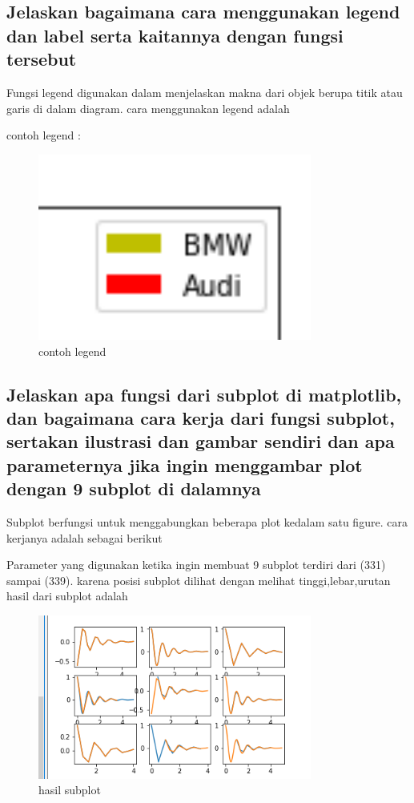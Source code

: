 \subsection{Jelaskan bagaimana cara menggunakan legend dan label serta kaitannya dengan fungsi tersebut}
Fungsi legend digunakan dalam menjelaskan makna dari objek berupa titik atau garis di dalam diagram.
cara menggunakan legend adalah 

contoh legend :
\begin{figure}[H]
    \includegraphics[width=9cm]{figures/6/Teori/1174004/4legend.png}
    \caption{contoh legend}
    \centering
\end{figure}

\subsection{Jelaskan apa fungsi dari subplot di matplotlib, dan bagaimana cara kerja dari fungsi subplot, sertakan ilustrasi dan gambar sendiri dan apa parameternya jika ingin menggambar plot dengan 9 subplot di dalamnya}
Subplot berfungsi untuk menggabungkan beberapa plot kedalam satu figure.
cara kerjanya adalah sebagai berikut

Parameter yang digunakan ketika ingin membuat 9 subplot terdiri dari (331) sampai (339). karena posisi subplot dilihat dengan melihat tinggi,lebar,urutan
hasil dari subplot adalah
\begin{figure}[H]
    \includegraphics[width=9cm]{figures/6/Teori/1174004/5subplot.png}
    \caption{hasil subplot}
    \centering
\end{figure}

